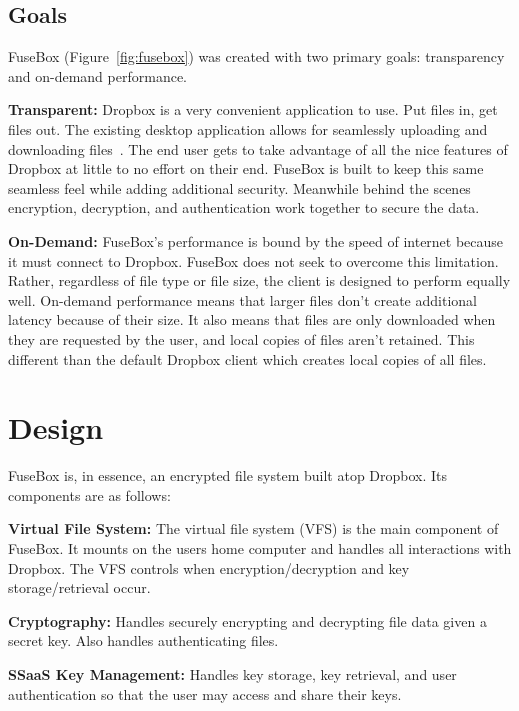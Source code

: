 \documentclass[11pt,twocolumn,letterpaper]{article}
\newcommand{\appname}{FuseBox }
\newcommand{\appnameWOspace}{FuseBox}
\begin{document}
\subsection{Goals}
\label{sec:goals}
\appname (Figure~\ref{fig:fusebox}) was created with two primary goals: transparency and
on-demand performance. 
\par {\bf Transparent:} Dropbox is a very convenient application to
use. Put files in, get files out. The existing desktop application
allows for seamlessly uploading and downloading files~\cite{dropboxclient}. The end user
gets to take advantage of all the nice features of Dropbox at little
to no effort on their end. \appname is built to keep this same 
seamless feel while adding additional security. Meanwhile behind the
scenes encryption, decryption, and authentication work together to
secure the data.     
\par {\bf On-Demand:} \appnameWOspace's performance is bound by
the speed of internet because it must connect to Dropbox. 
\appname does not seek to overcome this
limitation. Rather, regardless of file type or file size, the client
is designed to perform equally well. On-demand performance means that
larger files don't create additional latency because of their
size. It also means that files are only downloaded when they are requested
by the user, and local copies of files aren't retained. This different 
than the default Dropbox client which
creates local copies of all files. 

\section{Design}
\label{sec:design}
\appname is, in essence, an encrypted file system built atop
Dropbox. Its components are as follows:
\par {\bf Virtual File System:} The virtual file system (VFS) is the main component of 
\appnameWOspace. It mounts on the users home computer and handles 
all interactions with Dropbox. The VFS controls when
encryption/decryption and key storage/retrieval occur.   
\par {\bf Cryptography:} Handles securely encrypting and decrypting file data
given a secret key. Also handles authenticating files. 
\par {\bf SSaaS Key Management:} Handles key storage, key retrieval, and user
authentication so that the user may access and share their keys. 
\end{document}
